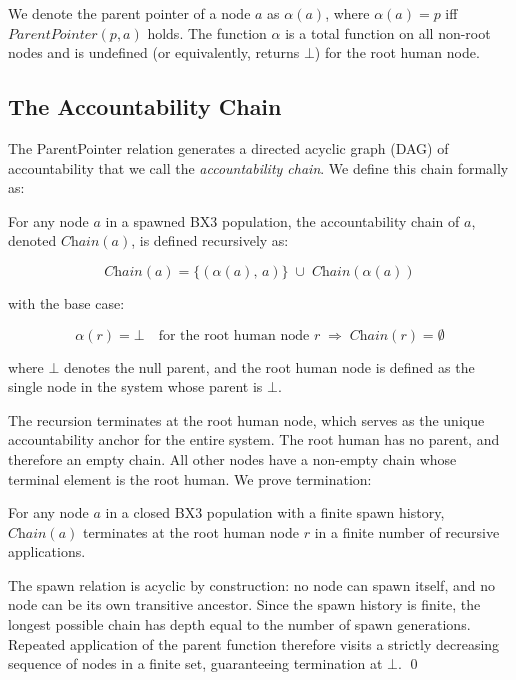 We denote the parent pointer of a node $a$ as $\alpha(a)$, where $\alpha(a) = p$ iff $\textit{ParentPointer}(p, a)$ holds. The function $\alpha$ is a total function on all non-root nodes and is undefined (or equivalently, returns $\bot$) for the root human node.

\subsection{The Accountability Chain}

The ParentPointer relation generates a directed acyclic graph (DAG) of accountability that we call the \textit{accountability chain}. We define this chain formally as:

\begin{definition}
\label{def:chain}
For any node $a$ in a spawned BX3 population, the accountability chain of $a$, denoted $\textit{Chain}(a)$, is defined recursively as:

\begin{equation}
\label{eq:chain-recursion}
\textit{Chain}(a) = \{( \alpha(a),\, a )\} \;\cup\; \textit{Chain}(\alpha(a))
\end{equation}

\noindent with the base case:

\begin{equation}
\label{eq:chain-base}
\alpha(r) = \bot \quad\text{for the root human node } r \;\Rightarrow\; \textit{Chain}(r) = \emptyset
\end{equation}

where $\bot$ denotes the null parent, and the root human node is defined as the single node in the system whose parent is $\bot$.
\end{definition}

The recursion terminates at the root human node, which serves as the unique accountability anchor for the entire system. The root human has no parent, and therefore an empty chain. All other nodes have a non-empty chain whose terminal element is the root human. We prove termination:

\begin{corrolary}
For any node $a$ in a closed BX3 population with a finite spawn history, $\textit{Chain}(a)$ terminates at the root human node $r$ in a finite number of recursive applications.
\end{corrolary}

\begin{Proof}
The spawn relation is acyclic by construction: no node can spawn itself, and no node can be its own transitive ancestor. Since the spawn history is finite, the longest possible chain has depth equal to the number of spawn generations. Repeated application of the parent function therefore visits a strictly decreasing sequence of nodes in a finite set, guaranteeing termination at $\bot$. \qed
\end{Proof}


